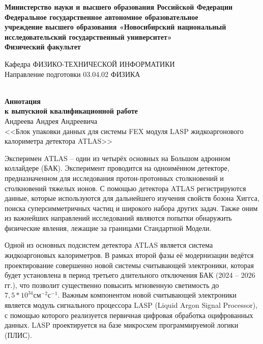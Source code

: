 \documentclass[a4paper, 12pt]{extarticle}
\begin{document}
\thispagestyle{empty}
\begin{center}
\textbf{Министерство науки и высшего образования Российской Федерации\\Федеральное государственное автономное образовательное\\учреждение высшего образования «Новосибирский национальный\\исследовательский государственный университет»\\ Физический факультет}
\end{center}

{\setlength{\parindent}{0cm}
Кафедра ФИЗИКО-ТЕХНИЧЕСКОЙ ИНФОРМАТИКИ\\
Направление подготовки 03.04.02 ФИЗИКА
}
\\~
\begin{center}
    \textbf{Аннотация\\
    к выпускной квалификационной работе}\\
    Андреева Андрея Андреевича\\
    <<Блок упаковки данных для системы FEX модуля LASP жидкоаргонового калориметра детектора ATLAS>>
\end{center}
\par
Эксперимен ATLAS – один из четырёх основных на Большом адронном коллайдере (БАК). Эксперимент проводится на одноимённом детекторе, предназначенном для исследования протон-протонных столкновений и столкновений тяжелых ионов. С помощью детектора ATLAS регистрируются данные, которые используются для дальнейшего изучения свойств бозона Хиггса, поиска суперсимметричных частиц и широкого набора других задач. Также оним из важнейших направлений исследований являются попытки обнаружить физические явления, лежащие за границами Стандартной Модели.\par
Одной из основных подсистем детектора ATLAS является система жидкоаргоновых калориметров. В рамках второй фазы её модернизации ведётся проектирование совершенно новой системы считывающей электроники, которая будет установлена в период третьего длительного отключения БАК (2024 -- 2026 гг.), что позволит существенно повысить мгновенную светимость до $7,5*10^{34}\text{см}^{-2}\text{с}^{-1}$. Важным компонентом новой считывающей электроники является модуль сигнального процессора LASP (Liquid Argon Signal Processor), с помощью которого реализуется первичная цифровая обработка оцифрованных данных. LASP проектируется на базе микросхем программируемой логики (ПЛИС).\par
\end{document}
